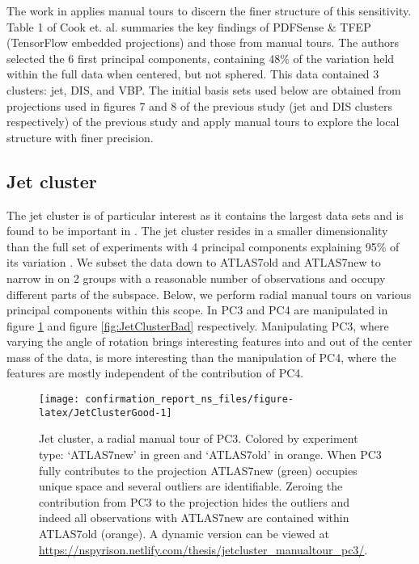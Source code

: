 \documentclass{monashthesis}
\begin{document}
The work in \textcite{cook_dynamical_2018} applies manual tours to
discern the finer structure of this sensitivity. Table 1 of Cook et. al.
summaries the key findings of PDFSense \& TFEP (TensorFlow embedded
projections) and those from manual tours. The authors selected the 6
first principal components, containing 48\% of the variation held within
the full data when centered, but not sphered. This data contained 3
clusters: jet, DIS, and VBP. The initial basis sets used below are
obtained from projections used in figures 7 and 8 of the previous study
(jet and DIS clusters respectively) of the previous study and apply
manual tours to explore the local structure with finer precision.

\subsection{Jet cluster}\label{jet-cluster}

The jet cluster is of particular interest as it contains the largest
data sets and is found to be important in
\textcite{wang_visualizing_2018}. The jet cluster resides in a smaller
dimensionality than the full set of experiments with 4 principal
components explaining 95\% of its variation
\autocite{cook_dynamical_2018}. We subset the data down to ATLAS7old and
ATLAS7new to narrow in on 2 groups with a reasonable number of
observations and occupy different parts of the subspace. Below, we
perform radial manual tours on various principal components within this
scope. In PC3 and PC4 are manipulated in figure \ref{fig:JetClusterGood}
and figure \ref{fig:JetClusterBad} respectively. Manipulating PC3, where
varying the angle of rotation brings interesting features into and out
of the center mass of the data, is more interesting than the
manipulation of PC4, where the features are mostly independent of the
contribution of PC4.










\begin{figure}

{\centering \texttt{[image: confirmation\_report\_ns\_files/figure-latex/JetClusterGood-1]} 

}

\caption{Jet cluster, a radial manual tour of PC3.
Colored by experiment type: `ATLAS7new' in green and `ATLAS7old' in
orange. When PC3 fully contributes to the projection ATLAS7new (green)
occupies unique space and several outliers are identifiable. Zeroing the
contribution from PC3 to the projection hides the outliers and indeed
all observations with ATLAS7new are contained within ATLAS7old (orange).
A dynamic version can be viewed at
\url{https://nspyrison.netlify.com/thesis/jetcluster_manualtour_pc3/}.}\label{fig:JetClusterGood}
\end{figure}
\end{document}
